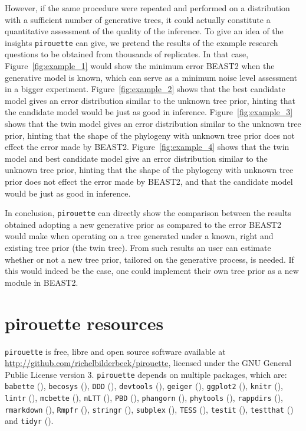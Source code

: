 However, if the same procedure were repeated and performed on a distribution 
with a sufficient number of generative trees, 
it could actually constitute a quantitative assessment 
of the quality of the inference.
To give an idea of the insights \verb;pirouette; can give,
we pretend the results of the example research questions
to be obtained from thousands of replicates.
In that case, Figure~\ref{fig:example_1} would show 
the minimum error BEAST2 when the
generative model is known, which can serve as 
a minimum noise level assessment in a bigger experiment.  
Figure~\ref{fig:example_2} shows that 
the best candidate model gives an error distribution similar to the unknown 
tree prior,
hinting that the candidate model would be just as good in inference.
Figure~\ref{fig:example_3} shows that 
the twin model gives an error distribution similar to the unknown tree prior,
hinting that the shape of the phylogeny with unknown tree prior
does not effect the error made by BEAST2.
Figure~\ref{fig:example_4} shows that 
the twin model and best candidate model give 
an error distribution similar to the unknown tree prior,
hinting that the shape of the phylogeny with unknown tree prior
does not effect the error made by BEAST2, 
and that the candidate model would be just as good in inference.

In conclusion, \verb;pirouette; can directly show 
the comparison between the results obtained 
adopting a new generative prior as compared to the error BEAST2 
would make when operating on a tree generated 
under a known, right and existing tree prior (the twin tree).
From such results an user can estimate whether or not a new tree prior, 
tailored on the generative process, is needed. 
If this would indeed be the case, 
one could implement their own tree prior as a new module in BEAST2.

\section{pirouette resources}

\verb;pirouette; is free, libre and open source software available at 
\url{http://github.com/richelbilderbeek/pirouette},
licensed under the GNU General Public License version 3.
\verb;pirouette; depends on multiple packages, which are:
\verb;babette; (\cite{bilderbeek2018babette}),
\verb;becosys; (\cite{becosys}),
\verb;DDD; (\cite{DDD}),
\verb;devtools; (\cite{devtools}),
\verb;geiger; (\cite{geiger}),
\verb;ggplot2; (\cite{ggplot2}),
\verb;knitr; (\cite{knitr}),
\verb;lintr; (\cite{lintr}),
\verb;mcbette; (\cite{mcbette}),
\verb;nLTT; (\cite{nLTT}),
\verb;PBD; (\cite{PBD}),
\verb;phangorn; (\cite{phangorn}),
\verb;phytools; (\cite{phytools}),
\verb;rappdirs; (\cite{rappdirs}),
\verb;rmarkdown; (\cite{rmarkdown}),
\verb;Rmpfr; (\cite{Rmpfr}),
\verb;stringr; (\cite{stringr}),
\verb;subplex; (\cite{subplex}),
\verb;TESS; (\cite{TESS}),
\verb;testit; (\cite{testit}), 
\verb;testthat; (\cite{testthat}) and
\verb;tidyr; (\cite{tidyr}).

